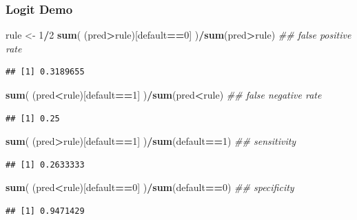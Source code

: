 \documentclass[
  shownotes,
  xcolor={svgnames},
  hyperref={colorlinks,citecolor=DarkBlue,linkcolor=DarkRed,urlcolor=DarkBlue}
  , aspectratio=169]{beamer}
\newenvironment{Shaded}{\begin{snugshade}}{\end{snugshade}}
\newcommand{\CommentTok}[1]{\textcolor[rgb]{0.56,0.35,0.01}{\textit{#1}}}
\newcommand{\DecValTok}[1]{\textcolor[rgb]{0.00,0.00,0.81}{#1}}
\newcommand{\KeywordTok}[1]{\textcolor[rgb]{0.13,0.29,0.53}{\textbf{#1}}}
\newcommand{\NormalTok}[1]{#1}
\newcommand{\OperatorTok}[1]{\textcolor[rgb]{0.81,0.36,0.00}{\textbf{#1}}}
\newcommand{\StringTok}[1]{\textcolor[rgb]{0.31,0.60,0.02}{#1}}
\begin{document}
\begin{frame}[fragile]
\frametitle{Logit Demo}

\begin{Shaded}
\begin{Highlighting}[]
\NormalTok{rule \textless{}{-}}\StringTok{ }\DecValTok{1}\OperatorTok{/}\DecValTok{2} 
\KeywordTok{sum}\NormalTok{( (pred}\OperatorTok{\textgreater{}}\NormalTok{rule)[default}\OperatorTok{==}\DecValTok{0}\NormalTok{] )}\OperatorTok{/}\KeywordTok{sum}\NormalTok{(pred}\OperatorTok{\textgreater{}}\NormalTok{rule) }\CommentTok{\#\# false positive rate}
\end{Highlighting}
\end{Shaded}

\begin{verbatim}
## [1] 0.3189655
\end{verbatim}

\begin{Shaded}
\begin{Highlighting}[]
\KeywordTok{sum}\NormalTok{( (pred}\OperatorTok{\textless{}}\NormalTok{rule)[default}\OperatorTok{==}\DecValTok{1}\NormalTok{] )}\OperatorTok{/}\KeywordTok{sum}\NormalTok{(pred}\OperatorTok{\textless{}}\NormalTok{rule) }\CommentTok{\#\# false negative rate}
\end{Highlighting}
\end{Shaded}

\begin{verbatim}
## [1] 0.25
\end{verbatim}

\begin{Shaded}
\begin{Highlighting}[]
\KeywordTok{sum}\NormalTok{( (pred}\OperatorTok{\textgreater{}}\NormalTok{rule)[default}\OperatorTok{==}\DecValTok{1}\NormalTok{] )}\OperatorTok{/}\KeywordTok{sum}\NormalTok{(default}\OperatorTok{==}\DecValTok{1}\NormalTok{) }\CommentTok{\#\# sensitivity}
\end{Highlighting}
\end{Shaded}

\begin{verbatim}
## [1] 0.2633333
\end{verbatim}

\begin{Shaded}
\begin{Highlighting}[]
\KeywordTok{sum}\NormalTok{( (pred}\OperatorTok{\textless{}}\NormalTok{rule)[default}\OperatorTok{==}\DecValTok{0}\NormalTok{] )}\OperatorTok{/}\KeywordTok{sum}\NormalTok{(default}\OperatorTok{==}\DecValTok{0}\NormalTok{) }\CommentTok{\#\# specificity}
\end{Highlighting}
\end{Shaded}

\begin{verbatim}
## [1] 0.9471429
\end{verbatim}

\end{frame}
\end{document}
